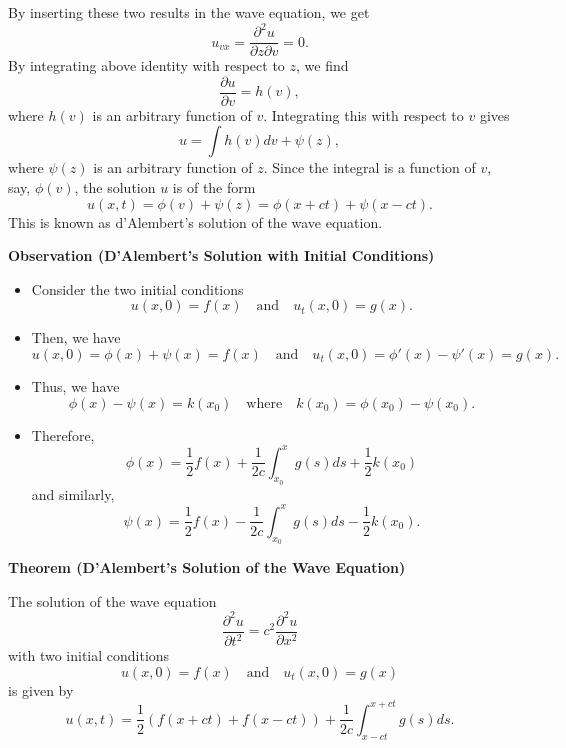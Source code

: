 \documentclass[12pt,openany]{book}
\theoremstyle{definition}
\begin{document}
	By inserting these two results in the wave equation, we get
	\[
	u_{vx} = \frac{\partial^2 u}{\partial z \partial v} = 0.
	\]
	By integrating above identity with respect to \( z \), we find
	\[
	\frac{\partial u}{\partial v} = h(v),
	\]
	where \( h(v) \) is an arbitrary function of \( v \). Integrating this with respect to \( v \) gives
	\[
	u = \int h(v) dv + \psi(z),
	\]
	where \( \psi(z) \) is an arbitrary function of \( z \). Since the integral is a function of \( v \), say, \( \phi(v) \), the solution \( u \) is of the form
	\[
	u(x, t) = \phi(v) + \psi(z) = \phi(x + ct) + \psi(x - ct).
	\]
	This is known as d'Alembert's solution of the wave equation.
	
	\textbf{Observation (D'Alembert's Solution with Initial Conditions)}
	
	\begin{itemize}
		\item Consider the two initial conditions
		\[
		u(x, 0) = f(x) \quad \text{and} \quad u_t(x, 0) = g(x).
		\]
		\item Then, we have
		\[
		u(x, 0) = \phi(x) + \psi(x) = f(x) \quad \text{and} \quad u_t(x, 0) = \phi'(x) - \psi'(x) = g(x).
		\]
		\item Thus, we have
		\[
		\phi(x) - \psi(x) = k(x_0) \quad \text{where} \quad k(x_0) = \phi(x_0) - \psi(x_0).
		\]
		\item Therefore,
		\[
		\phi(x) = \frac{1}{2} f(x) + \frac{1}{2c} \int_{x_0}^{x} g(s) ds + \frac{1}{2} k(x_0)
		\]
		and similarly,
		\[
		\psi(x) = \frac{1}{2} f(x) - \frac{1}{2c} \int_{x_0}^{x} g(s) ds - \frac{1}{2} k(x_0).
		\]
	\end{itemize}
	
	\textbf{Theorem (D'Alembert's Solution of the Wave Equation)}
	
	The solution of the wave equation
	\[
	\frac{\partial^2 u}{\partial t^2} = c^2 \frac{\partial^2 u}{\partial x^2}
	\]
	with two initial conditions
	\[
	u(x, 0) = f(x) \quad \text{and} \quad u_t(x, 0) = g(x)
	\]
	is given by
	\[
	u(x, t) = \frac{1}{2} (f(x + ct) + f(x - ct)) + \frac{1}{2c} \int_{x-ct}^{x+ct} g(s) ds.
	\]
	\newpage
	
\end{document}
